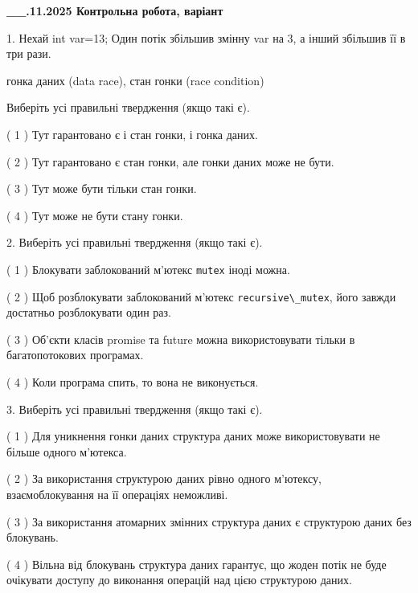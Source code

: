 \documentclass[12pt, ukrainian]{article}
\def\code#1{\Verb!#1!}
\begin{document}
\newpage
\begin {large}

\textbf{\_\_.11.2025 Контрольна робота, варіант  }\par


{
1. Нехай int var=13; Один потік збільшив змінну var на 3, а інший збільшив її в три рази.

гонка даних (data race), стан гонки (race condition)

Виберіть усі правильні твердження (якщо такі є).\par
\vspace{2mm}
( 1 ) Тут гарантовано є і стан гонки, і гонка даних.%

( 2 ) Тут гарантовано є стан гонки, але гонки даних може не бути.%

( 3 ) Тут може бути тільки стан гонки.%

( 4 ) Тут може не бути стану гонки.%


2. Виберіть усі правильні твердження (якщо такі є).\par
\vspace{2mm}

( 1 ) Блокувати заблокований м’ютекс  \code{mutex} іноді можна.%

( 2 ) Щоб розблокувати заблокований м’ютекс \code{recursive\_mutex}, його завжди достатньо розблокувати один раз.%

( 3 ) Об’єкти класів promise та future можна використовувати тільки в багатопотокових програмах.%

( 4 ) Коли програма спить, то вона не виконується.%


3. Виберіть усі правильні твердження (якщо такі є).\par
\vspace{2mm}

( 1 ) Для уникнення гонки даних структура даних може використовувати не більше одного м’ютекса.%

( 2 ) За використання структурою даних рівно одного м’ютексу, взаємоблокування на її операціях неможливі.%

( 3 ) За використання атомарних змінних структура даних є структурою даних без блокувань.%

( 4 ) Вільна від блокувань структура даних гарантує, що жоден потік не буде очікувати доступу до виконання операцій над цією структурою даних.%


}
\end{large}
\end{document}
